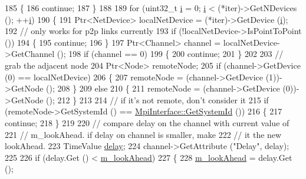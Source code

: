 \begin{DoxyCode}
185             \{
186               \textcolor{keywordflow}{continue};
187             \}
188 
189           \textcolor{keywordflow}{for} (uint32\_t \hyperlink{bernuolliDistribution_8m_a6f6ccfcf58b31cb6412107d9d5281426}{i} = 0; \hyperlink{bernuolliDistribution_8m_a6f6ccfcf58b31cb6412107d9d5281426}{i} < (*iter)->GetNDevices (); ++\hyperlink{bernuolliDistribution_8m_a6f6ccfcf58b31cb6412107d9d5281426}{i})
190             \{
191               Ptr<NetDevice> localNetDevice = (*iter)->GetDevice (\hyperlink{bernuolliDistribution_8m_a6f6ccfcf58b31cb6412107d9d5281426}{i});
192               \textcolor{comment}{// only works for p2p links currently}
193               \textcolor{keywordflow}{if} (!localNetDevice->IsPointToPoint ())
194                 \{
195                   \textcolor{keywordflow}{continue};
196                 \}
197               Ptr<Channel> channel = localNetDevice->GetChannel ();
198               \textcolor{keywordflow}{if} (channel == 0)
199                 \{
200                   \textcolor{keywordflow}{continue};
201                 \}
202 
203               \textcolor{comment}{// grab the adjacent node}
204               Ptr<Node> remoteNode;
205               \textcolor{keywordflow}{if} (channel->GetDevice (0) == localNetDevice)
206                 \{
207                   remoteNode = (channel->GetDevice (1))->GetNode ();
208                 \}
209               \textcolor{keywordflow}{else}
210                 \{
211                   remoteNode = (channel->GetDevice (0))->GetNode ();
212                 \}
213 
214               \textcolor{comment}{// if it's not remote, don't consider it}
215               \textcolor{keywordflow}{if} (remoteNode->GetSystemId () == \hyperlink{classns3_1_1MpiInterface_a7f1f671b55948fb1c8f7eb54f22a9619}{MpiInterface::GetSystemId} ())
216                 \{
217                   \textcolor{keywordflow}{continue};
218                 \}
219 
220               \textcolor{comment}{// compare delay on the channel with current value of}
221               \textcolor{comment}{// m\_lookAhead.  if delay on channel is smaller, make}
222               \textcolor{comment}{// it the new lookAhead.}
223               TimeValue \hyperlink{lte_2model_2fading-traces_2fading__trace__generator_8m_a7964e6aa8f61a9d28973c8267a606ad8}{delay};
224               channel->GetAttribute (\textcolor{stringliteral}{"Delay"}, delay);
225 
226               \textcolor{keywordflow}{if} (delay.Get () < \hyperlink{classns3_1_1DistributedSimulatorImpl_af223a2f60c7b91af0b12ba7ba174a47e}{m\_lookAhead})
227                 \{
228                   \hyperlink{classns3_1_1DistributedSimulatorImpl_af223a2f60c7b91af0b12ba7ba174a47e}{m\_lookAhead} = delay.Get ();

\end{DoxyCode}
